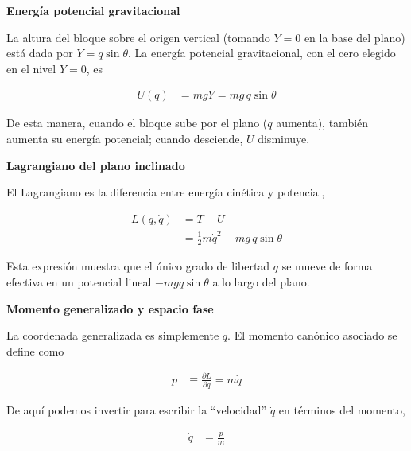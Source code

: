 \documentclass{article}
\begin{document}
\vspace{0.5cm}
\textbf{Energía potencial gravitacional}

La altura del bloque sobre el origen vertical (tomando \(Y=0\) en la base del plano)
está dada por \(Y = q\sin\theta\).  
La energía potencial gravitacional, con el cero elegido en el nivel \(Y=0\), es

\begin{equation}
\begin{split}
U(q) &= m g Y = m g\,q\sin\theta
\end{split}\label{eq:U-plano-inclinado}
\end{equation}

De esta manera, cuando el bloque sube por el plano (\(q\) aumenta), también aumenta
su energía potencial; cuando desciende, \(U\) disminuye.

\vspace{0.5cm}
\textbf{Lagrangiano del plano inclinado}

El Lagrangiano es la diferencia entre energía cinética y potencial,

\begin{equation}
\begin{split}
L(q,\dot q)
&= T - U \\[4pt]
&= \frac{1}{2}m\dot q^{2} - m g\,q\sin\theta
\end{split}\label{eq:L-plano-inclinado}
\end{equation}

Esta expresión muestra que el único grado de libertad \(q\) se mueve de forma
efectiva en un potencial lineal \(-m g q\sin\theta\) a lo largo del plano.

\vspace{0.5cm}
\textbf{Momento generalizado y espacio fase}

La coordenada generalizada es simplemente \(q\).  
El momento canónico asociado se define como

\begin{equation}
\begin{split}
p &\equiv \frac{\partial L}{\partial\dot q}
       = m\dot q
\end{split}\label{eq:momento-plano-inclinado}
\end{equation}

De aquí podemos invertir para escribir la “velocidad” \(\dot q\) en términos del
momento,

\begin{equation}
\begin{split}
\dot q &= \frac{p}{m}
\end{split}\label{eq:velocidad-en-funcion-de-p}
\end{equation}
\end{document}
